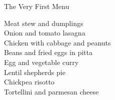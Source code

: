 
    
		\begin{menu}{The Very First Menu}
    
    \begin{recipelist}
    Meat stew and dumplings\\
    Onion and tomato lasagna\\
    Chicken with cabbage and peanuts\\
    Beans and fried eggs in pitta\\
    Egg and vegetable curry\\
    Lentil shepherds pie\\
    Chickpea risotto\\
    Tortellini and parmesan cheese\\
    
    \end{recipelist}
  

\end{menu}
